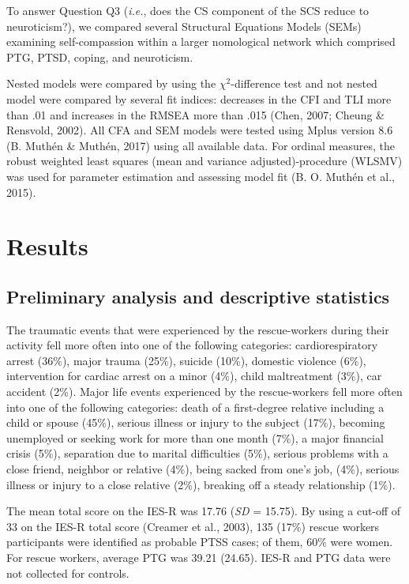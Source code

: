 \documentclass[
  english,
  man,floatsintext]{apa7}
\begin{document}
To answer Question Q3 (\emph{i.e.}, does the CS component of the SCS reduce to neuroticism?), we compared several Structural Equations Models (SEMs) examining self-compassion within a larger nomological network which comprised PTG, PTSD, coping, and neuroticism.

Nested models were compared by using the \(\chi^2\)-difference test and not nested model were compared by several fit indices: decreases in the CFI and TLI more than .01 and increases in the RMSEA more than .015 (Chen, 2007; Cheung \& Rensvold, 2002). All CFA and SEM models were tested using Mplus version 8.6 (B. Muthén \& Muthén, 2017) using all available data. For ordinal measures, the robust weighted least squares (mean and variance adjusted)-procedure (WLSMV) was used for parameter estimation and assessing model fit (B. O. Muthén et al., 2015).

\hypertarget{results}{%
\section{Results}\label{results}}

\hypertarget{preliminary-analysis-and-descriptive-statistics}{%
\subsection{Preliminary analysis and descriptive statistics}\label{preliminary-analysis-and-descriptive-statistics}}

The traumatic events that were experienced by the rescue-workers during their activity fell more often into one of the following categories: cardiorespiratory arrest (36\%), major trauma (25\%), suicide (10\%), domestic violence (6\%), intervention for cardiac arrest on a minor (4\%), child maltreatment (3\%), car accident (2\%).
Major life events experienced by the rescue-workers fell more often into one of the following categories: death of a first-degree relative including a child or spouse (45\%), serious illness or injury to the subject (17\%), becoming unemployed or seeking work for more than one month (7\%), a major financial crisis (5\%), separation due to marital difficulties (5\%), serious problems with a close friend, neighbor or relative (4\%), being sacked from one's job, (4\%), serious illness or injury to a close relative (2\%), breaking off a steady relationship (1\%).

The mean total score on the IES-R was 17.76 (\emph{SD} = 15.75). By using a cut-off of 33 on the IES-R total score (Creamer et al., 2003), 135 (17\%) rescue workers participants were identified as probable PTSS cases; of them, 60\% were women. For rescue workers, average PTG was 39.21 (24.65). IES-R and PTG data were not collected for controls.
\end{document}
